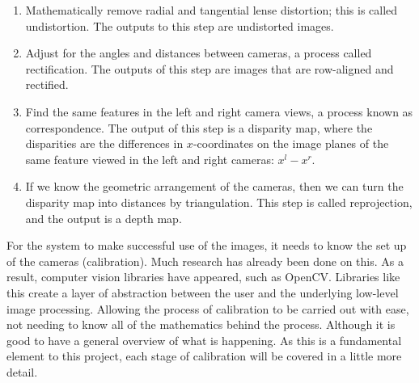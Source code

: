 \documentclass[11pt,oneside]{report}
\begin{document}
			\begin{enumerate}
				\item Mathematically remove radial and tangential lense distortion; this is called undistortion. The outputs to this step are undistorted images.
				
				\item Adjust for the angles and distances between cameras, a process called rectification. The outputs of this step are images that are row-aligned and rectified.
				
				\item Find the same features in the left and right camera views, a process known as correspondence. The output of this step is a disparity map, where the disparities are the differences in $x$-coordinates on the image planes of the same feature viewed in the left and right cameras: $x^{l} - x^{r}$.
				
				\item If we know the geometric arrangement of the cameras, then we can turn the disparity map into distances by triangulation. This step is called reprojection, and the output is a depth map.
			\end{enumerate}
			
			For the system to make successful use of the images, it needs to know the set up of the cameras (calibration).
			Much research has already been done on this.
			As a result, computer vision libraries have appeared, such as OpenCV.
			Libraries like this create a layer of abstraction between the user and the underlying low-level image processing.
			Allowing the process of calibration to be carried out with ease, not needing to know all of the mathematics behind the process.
			Although it is good to have a general overview of what is happening.
			As this is a fundamental element to this project, each stage of calibration will be covered in a little more detail.
\end{document}

